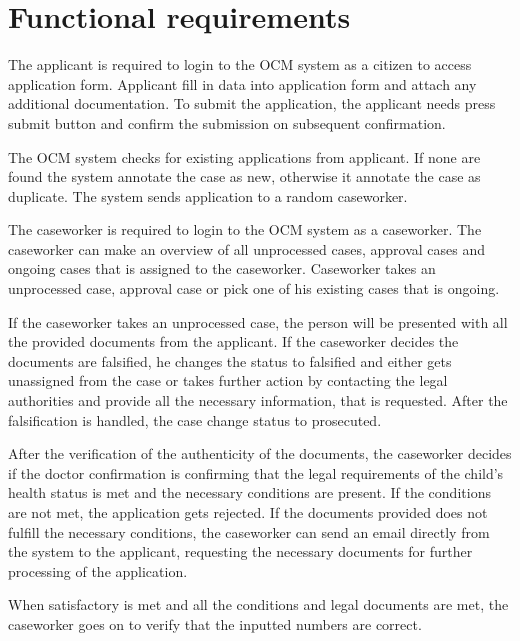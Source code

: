 \newpage
\section{Functional requirements}

The applicant is required to login to the OCM system as a citizen to access application form. Applicant fill in data into application form and attach any additional documentation. To submit the application, the applicant needs press submit button and confirm the submission on subsequent confirmation.

\vspace{2mm}

The OCM system checks for existing applications from applicant. If none are found the system annotate the case as new, otherwise it annotate the case as duplicate. The system sends application to a random caseworker.

\vspace{2mm}

The caseworker is required to login to the OCM system as a caseworker. The caseworker can make an overview of all unprocessed cases, approval cases and ongoing cases that is assigned to the caseworker. Caseworker takes an unprocessed case, approval case or pick one of his existing cases that is ongoing.

If the caseworker takes an unprocessed case, the person will be presented with all the provided documents from the applicant. If the caseworker decides the documents are falsified, he changes the status to falsified and either gets unassigned from the case or takes further action by contacting the legal authorities and provide all the necessary information, that is requested. After the falsification is handled, the case change status to prosecuted.

After the verification of the authenticity of the documents, the caseworker decides if the doctor confirmation is confirming that the legal requirements of the child's health status is met and the necessary conditions are present. 
If the conditions are not met, the application gets rejected. 
If the documents provided does not fulfill the necessary conditions, the caseworker can send an email directly from the system to the applicant, requesting the necessary documents for further processing of the application.

When satisfactory is met and all the conditions and legal documents are met, the caseworker goes on to verify that the inputted numbers are correct.

